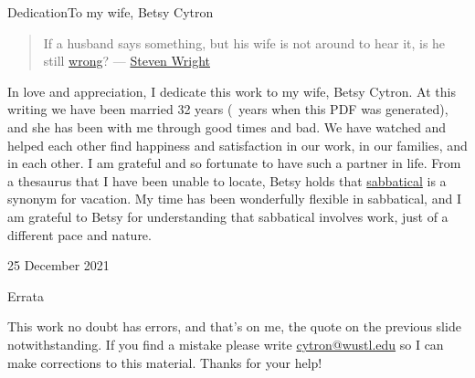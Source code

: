 \begin{frame}{Dedication}{To my wife, Betsy Cytron}
\begin{quote}
    If a husband says something, but his wife is not around to hear it, is he still \href{https://en.wikipedia.org/wiki/Ron\%27s_Gone_Wrong}{wrong}? --- \href{https://en.wikipedia.org/wiki/Steven_Wright}{Steven Wright}
\end{quote}
In love and appreciation, I dedicate this work to my wife, Betsy Cytron.  At this writing we have been married 32 years (\number\numexpr{}\relax~years when this PDF was generated), and she has been with me through good times and bad. We have watched and helped each other find happiness and satisfaction in our work, in our families, and in each other.  I am grateful and so fortunate to have such a partner in life.
\SmallSkip{}
From a thesaurus that I have been unable to locate,  Betsy holds that \href{https://www.merriam-webster.com/dictionary/sabbatical}{sabbatical} is a synonym for vacation.  My time has been wonderfully flexible in sabbatical, and I am grateful to Betsy for understanding that sabbatical involves work, just of a different pace and nature.
\begin{flushright}25 December 2021\end{flushright}
\end{frame}
\begin{frame}{Errata}

This work no doubt has errors, and that's on me, the quote on the previous slide notwithstanding.  If you find a mistake please write \href{mailto:cytron@wustl.edu}{cytron@wustl.edu} so I can make corrections to this material.
\BigSkip{}
Thanks for your help!
\end{frame}

